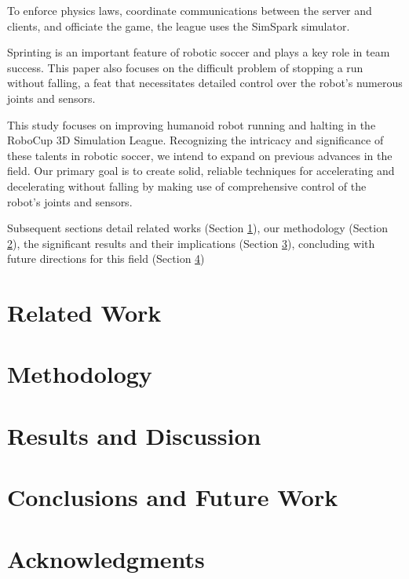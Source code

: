 \documentclass[conference]{IEEEtran}
\begin{document}
To enforce physics laws, coordinate communications between the server and clients, and officiate the game, the league uses the SimSpark simulator.

Sprinting is an important feature of robotic soccer and plays a key role in team success. This paper also focuses on the difficult problem of stopping a run without falling, a feat that necessitates detailed control over the robot's numerous joints and sensors.

This study focuses on improving humanoid robot running and halting in the RoboCup 3D Simulation League.
Recognizing the intricacy and significance of these talents in robotic soccer, we intend to expand on previous advances in the field.
Our primary goal is to create solid, reliable techniques for accelerating and decelerating without falling by making use of comprehensive control
of the robot's joints and sensors.

Subsequent sections detail related works (Section \ref{Related Work}), our methodology (Section \ref{Methodology}),
the significant results and their implications (Section \ref{Results and Discussion}),
concluding with future directions for this field (Section \ref{Conclusions and Future Work})

\section{Related Work}\label{Related Work}


\section{Methodology}\label{Methodology}

\section{Results and Discussion}\label{Results and Discussion}

\section{Conclusions and Future Work}\label{Conclusions and Future Work}

\section{Acknowledgments}\label{Acknowledgments}
\end{document}
